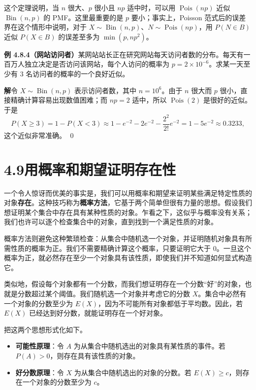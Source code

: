 \documentclass[UTF8,12pt,a4paper,fontset=fandol]{ctexart}
\begin{document}
这个定理说明，当 $n$ 很大、$p$ 很小且 $np$ 适中时，可以用 $\operatorname{Pois}(np)$ 近似 $\operatorname{Bin}(n,p)$ 的 PMF。这里最重要的是 $p$ 要小；事实上，Poisson 范式后的误差界在这个情形中说明，对于 $X\sim\operatorname{Bin}(n,p)$、$N\sim\operatorname{Pois}(np)$，用 $P(N\in B)$ 近似 $P(X\in B)$ 的误差至多为 $\min(p,np^2)$。

\noindent\textbf{例 4.8.4（网站访问者）}\quad 某网站站长正在研究网站每天访问者数的分布。每天有一百万人独立决定是否访问该网站，每个人访问的概率为 $p=2\times 10^{-6}$。求某一天至少有 $3$ 名访问者的概率的一个良好近似。

\noindent\textbf{解}\quad 令 $X\sim\operatorname{Bin}(n,p)$ 表示访问者数，其中 $n=10^6$。由于 $n$ 很大而 $p$ 很小，直接精确计算容易出现数值困难；而 $np=2$ 适中，所以 $\operatorname{Pois}(2)$ 是很好的近似。于是
\[
  P(X\ge 3)=1-P(X<3)\approx
  1-e^{-2}-2e^{-2}-\frac{2^2}{2!}e^{-2}
  =1-5e^{-2}\approx 0.3233,
\]
这个近似非常准确。 \qed

\section*{4.9\quad 用概率和期望证明存在性}

一个令人惊讶而优美的事实是，我们可以用概率和期望来证明某些满足特定性质的对象\textbf{存在}。这种技巧称为\textbf{概率方法}，它基于两个简单但很有力量的思想。假设我们想证明某个集合中存在具有某种性质的对象。乍看之下，这似乎与概率没有关系；我们也许可以逐个检查集合中的对象，直到找到一个满足性质的对象。

概率方法则避免这种繁琐检查：从集合中随机选一个对象，并证明随机对象具有所需性质的概率为正。我们不需要精确计算这个概率，只要证明它大于 $0$。一旦这个概率为正，就必然存在至少一个对象具有该性质，即使我们并不知道如何显式构造它。

类似地，假设每个对象都有一个分数，而我们想证明存在一个分数“好”的对象，也就是分数超过某个阈值。我们随机选一个对象并考虑它的分数 $X$。集合中必然有一个对象的分数至少为 $E(X)$，因为不可能所有对象都低于平均数。因此，若 $E(X)$ 已经达到好分数，就能证明存在一个好对象。

把这两个思想形式化如下。
\begin{itemize}
  \item \textbf{可能性原理}：令 $A$ 为从集合中随机选出的对象具有某性质的事件。若 $P(A)>0$，则存在具有该性质的对象。
  \item \textbf{好分数原理}：令 $X$ 为从集合中随机选出的对象的分数。若 $E(X)\ge c$，则存在一个对象的分数至少为 $c$。
\end{itemize}
\end{document}
